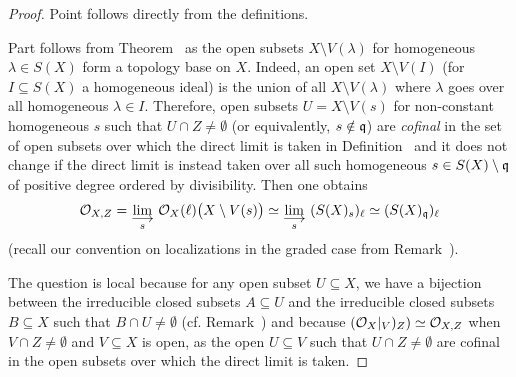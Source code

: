 \documentclass[a4paper,parskip=half,numbers=enddot, DIV=12, headheight=30pt]{scrreprt}
\begin{document}
\begin{proof}
Point  follows directly from the definitions.

Part  follows from Theorem~ as the open subsets $X\setminus V(\lambda)$ for homogeneous $\lambda\in S(X)$ form a topology base on $X$. Indeed, an open set $X\setminus V(I)$ (for $I\subseteq S(X)$ a homogeneous ideal) is the union of all $X\setminus V(\lambda)$ where $\lambda$ goes over all homogeneous $\lambda\in I$. Therefore, open subsets $U= X\setminus V(s)$ for non-constant homogeneous $s$ such that $U\cap Z \neq \emptyset$ (or equivalently, $s\notin\mathfrak{q}$) are \emph{cofinal} in the set of open subsets over which the direct limit is taken in Definition~ and it does not change if the direct limit is instead taken over all such homogeneous $s\in S(X)\setminus\mathfrak{q}$ of positive degree ordered by divisibility. Then one obtains 
\begin{align*}
	\Oo_{X,Z}=\colimit[s]\Oo_X(\ell)\big(X\setminus V(s)\big)\simeq\colimit[s] (S(X)_s)_\ell \simeq (S(X)_\qq)_\ell
\end{align*}
(recall our convention on localizations in the graded case from Remark~).

The question  is local because for any open subset $U\subseteq X$, we have a bijection between the irreducible closed subsets $A\subseteq U$ and the irreducible closed subsets $B\subseteq X$ such that $B\cap U\neq\emptyset$ (cf. Remark~) and because $(\mathcal{O}_X|_V)_Z) \simeq \mathcal{O}_{X,Z}$ when $V\cap Z\neq \emptyset$ and $V\subseteq X$ is open, as the open $U\subseteq V$ such that $U\cap Z\neq\emptyset$ are cofinal in the open subsets over which the direct limit is taken.


\end{proof}
\end{document}
